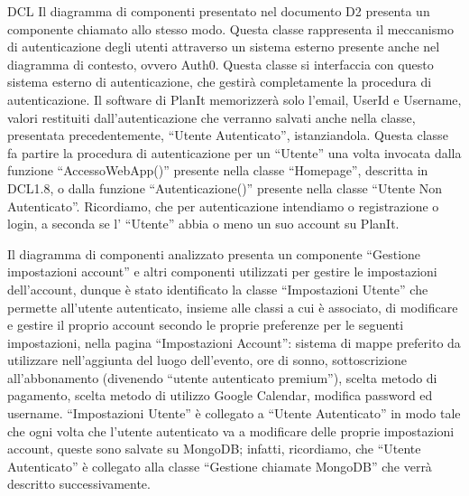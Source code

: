 \begin{listaPersonale}{DCL}
    Il diagramma di componenti presentato nel documento D2 presenta un componente chiamato allo stesso modo. Questa classe rappresenta il meccanismo di autenticazione degli utenti attraverso un sistema esterno presente anche nel diagramma di contesto, ovvero Auth0. Questa classe si interfaccia con questo sistema esterno di autenticazione, che gestirà completamente la procedura di autenticazione. Il software di PlanIt memorizzerà solo l'email, UserId e Username, valori restituiti dall'autenticazione che verranno salvati anche nella classe, presentata precedentemente, “Utente Autenticato”, istanziandola. Questa classe fa partire la procedura di autenticazione per un “Utente” una volta invocata dalla funzione “AccessoWebApp()” presente nella classe “Homepage”, descritta in DCL1.8, o dalla funzione “Autenticazione()” presente nella classe “Utente Non Autenticato”. Ricordiamo, che per autenticazione intendiamo o registrazione o login, a seconda se l' “Utente” abbia o meno un suo account su PlanIt.



    Il diagramma di componenti analizzato presenta un componente “Gestione impostazioni account” e altri componenti utilizzati per gestire le impostazioni dell'account, dunque è stato identificato la classe “Impostazioni Utente” che permette all'utente autenticato, insieme alle classi a cui è associato, di modificare e gestire il proprio account secondo le proprie preferenze per le seguenti impostazioni, nella pagina “Impostazioni Account”: sistema di mappe preferito da utilizzare nell'aggiunta del luogo dell'evento, ore di sonno, sottoscrizione all'abbonamento (divenendo “utente autenticato premium”), scelta metodo di pagamento, scelta metodo di utilizzo Google Calendar, modifica password ed username.
    “Impostazioni Utente” è collegato a “Utente Autenticato” in modo tale che ogni volta che l'utente autenticato va a modificare delle proprie impostazioni account, queste sono salvate su MongoDB; infatti, ricordiamo, che “Utente Autenticato” è collegato alla classe “Gestione chiamate MongoDB” che verrà descritto successivamente.

    \begin{listaPersonale2}[DCL]{}


\end{listaPersonale2}
\end{listaPersonale}
